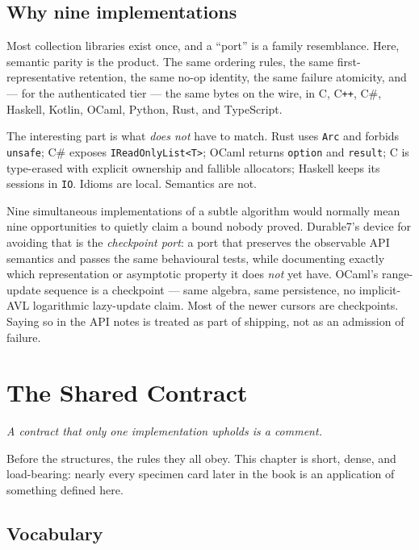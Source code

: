 \documentclass[11pt,twoside,openright]{book}
\newcommand{\code}[1]{\texorpdfstring{\textcolor{d7ink}{\texttt{#1}}}{#1}}
\newcommand{\term}[1]{\textit{#1}}
\newcommand{\motto}[1]{%
  \begingroup
  \vspace{-4pt}\hfill\begin{minipage}{0.80\textwidth}
    \raggedleft\itshape\color{d7slate}\small #1\par
  \end{minipage}\par\vspace{18pt}
  \endgroup}
\begin{document}
\section{Why nine implementations}

Most collection libraries exist once, and a ``port'' is a family resemblance.
Here, semantic parity is the product. The same ordering rules, the same
first-representative retention, the same no-op identity, the same failure
atomicity, and --- for the authenticated tier --- the same bytes on the wire, in
C, C\texttt{++}, C\#, Haskell, Kotlin, OCaml, Python, Rust, and TypeScript.

The interesting part is what \emph{does not} have to match. Rust uses
\code{Arc} and forbids \code{unsafe}; C\# exposes \code{IReadOnlyList<T>};
OCaml returns \code{option} and \code{result}; C is type-erased with explicit
ownership and fallible allocators; Haskell keeps its sessions in \code{IO}.
Idioms are local. Semantics are not.

\begin{asidebox}
Nine simultaneous implementations of a subtle algorithm would normally mean nine
opportunities to quietly claim a bound nobody proved. Durable7's device for
avoiding that is the \term{checkpoint port}: a port that preserves the
observable API semantics and passes the same behavioural tests, while
documenting exactly which representation or asymptotic property it does
\emph{not} yet have. OCaml's range-update sequence is a checkpoint --- same
algebra, same persistence, no implicit-AVL logarithmic lazy-update claim. Most
of the newer cursors are checkpoints. Saying so in the API notes is treated as
part of shipping, not as an admission of failure.
\end{asidebox}

\chapter{The Shared Contract}
\label{ch:contract}

\motto{A contract that only one implementation upholds is a comment.}

\noindent
Before the structures, the rules they all obey. This chapter is short, dense,
and load-bearing: nearly every specimen card later in the book is an application
of something defined here.

\section{Vocabulary}
\end{document}
